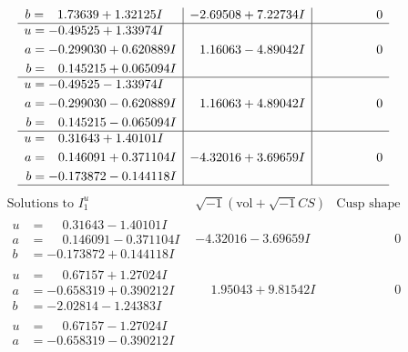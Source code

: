 \documentclass[1p]{elsarticle_modified}
\theoremstyle{definition}
\newcommand{\I}{\sqrt{-1}}
\begin{document}
$$\begin{array}{c|c|c}
\begin{aligned}
b &= \phantom{-}1.73639 + 1.32125 I\end{aligned}
 & -2.69508 + 7.22734 I & \phantom{-0.000000 } 0 \\ \hline\begin{aligned}
u &= -0.49525 + 1.33974 I \\
a &= -0.299030 + 0.620889 I \\
b &= \phantom{-}0.145215 + 0.065094 I\end{aligned}
 & \phantom{-}1.16063 - 4.89042 I & \phantom{-0.000000 } 0 \\ \hline\begin{aligned}
u &= -0.49525 - 1.33974 I \\
a &= -0.299030 - 0.620889 I \\
b &= \phantom{-}0.145215 - 0.065094 I\end{aligned}
 & \phantom{-}1.16063 + 4.89042 I & \phantom{-0.000000 } 0 \\ \hline\begin{aligned}
u &= \phantom{-}0.31643 + 1.40101 I \\
a &= \phantom{-}0.146091 + 0.371104 I \\
b &= -0.173872 - 0.144118 I\end{aligned}
 & -4.32016 + 3.69659 I & \phantom{-0.000000 } 0\\
 \hline 
 \end{array}$$\newpage$$\begin{array}{c|c|c}  
\text{Solutions to }I^u_{1}& \I (\text{vol} + \sqrt{-1}CS) & \text{Cusp shape}\\
 \hline 
\begin{aligned}
u &= \phantom{-}0.31643 - 1.40101 I \\
a &= \phantom{-}0.146091 - 0.371104 I \\
b &= -0.173872 + 0.144118 I\end{aligned}
 & -4.32016 - 3.69659 I & \phantom{-0.000000 } 0 \\ \hline\begin{aligned}
u &= \phantom{-}0.67157 + 1.27024 I \\
a &= -0.658319 + 0.390212 I \\
b &= -2.02814 - 1.24383 I\end{aligned}
 & \phantom{-}1.95043 + 9.81542 I & \phantom{-0.000000 } 0 \\ \hline\begin{aligned}
u &= \phantom{-}0.67157 - 1.27024 I \\
a &= -0.658319 - 0.390212 I \\

\end{aligned}
\end{array}$$
\end{document}
